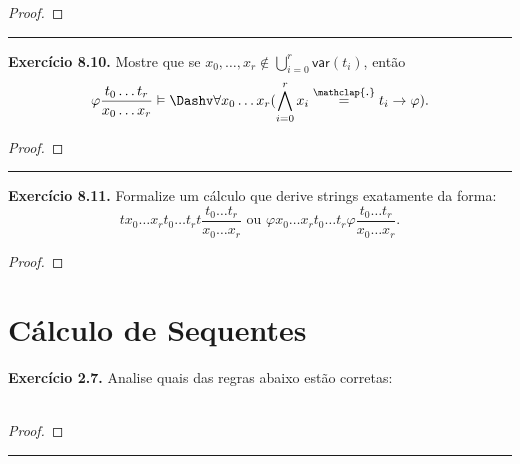 \documentclass[11pt]{article}
\theoremstyle{definition}
\newcommand{\msf}[1]{\mathsf{#1}}
\newcommand\overtext[2]{\stackrel{\mathclap{\normalfont\mbox{#1}}}{#2}}
\begin{document}
\begin{proof}
    
\end{proof}

\hrule

\textbf{Exercício 8.10.} Mostre que se $x_0,\dots,x_r\notin\bigcup_{i=0}^r\msf{var}(t_i)$, então
$$\varphi\frac{t_0\dots t_r}{x_0\dots x_r}\vDash\Dashv\forall x_0\dots x_r(\bigwedge_{i=0}^rx_i\overtext{.}{=}t_i\rightarrow\varphi).$$

\begin{proof}
    
\end{proof}

\hrule

\textbf{Exercício 8.11.} Formalize um cálculo que derive strings exatamente da forma: $$tx_0\dots x_rt_0\dots t_rt\frac{t_0\dots t_r}{x_0\dots x_r}\text{ ou }\varphi x_0\dots x_rt_0\dots t_r\varphi\frac{t_0\dots t_r}{x_0\dots x_r}.$$

\begin{proof}
    
\end{proof}

\section{Cálculo de Sequentes}

\textbf{Exercício 2.7.} Analise quais das regras abaixo estão corretas:\\
~~~~~~
\begin{proof}
    
\end{proof}

\hrule
\end{document}
